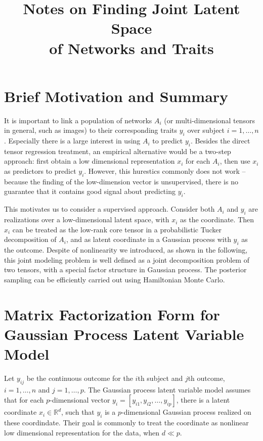 \documentclass[11pt]{article}
\title{\textbf{Notes on Finding Joint Latent Space\\of Networks and Traits}}
\author{}
\date{}
\begin{document}
\maketitle

\section{Brief Motivation and Summary}

It is important to link a population of networks $A_i$ (or multi-dimensional tensors in general, such as images) to their corresponding traits $y_i$ over subject $i=1,\ldots,n$. Especially there is a large interest in using $A_i$ to predict $y_i$. Besides the direct tensor regression treatment, an empirical alternative would be a two-step approach: first obtain a low dimensional representation $x_i$ for each $A_i$, then use $x_i$ as predictors to predict $y_i$. However, this hurestics commonly does not work -- because the finding of the low-dimension vector is unsupervised, there is no guarantee that it contains good signal about predicting $y_i$.

This motivates us to consider a supervised approach. Consider both $A_i$ and $y_i$ are realizations over a low-dimensional latent space, with $x_i$ as the coordinate. Then $x_i$ can be treated as the low-rank core tensor in a probabilistic Tucker decomposition of $A_i$, and as latent coordinate in a Gaussian process with $y_i$ as the outcome. Despite of nonlinearity we introduced, as shown in the following, this joint modeling problem is well defined as a joint decomposition problem of two tensors, with a special factor structure in Gaussian process. The posterior sampling can be efficiently carried out using Hamiltonian Monte Carlo.

\section{Matrix Factorization Form for Gaussian Process Latent Variable Model}

Let $y_{ij}$ be the continuous outcome for the $i$th subject and $j$th outcome, $i=1,\ldots,n$ and $j=1,\ldots,p$. The Gaussian process latent variable model assumes that for each $p$-dimensional vector $y_{i} =[ y_{i1}, y_{i2}, \ldots, y_{ip} ]$, there is a latent coordinate $x_i \in \mathbb {R}^d$, such that $y_{i}$ is a $p$-dimensional Gaussian process realized on these coordindate. Their goal is commonly to treat the coordinate as nonlinear low dimensional representation for the data, when $d \ll p$. 
\end{document}
